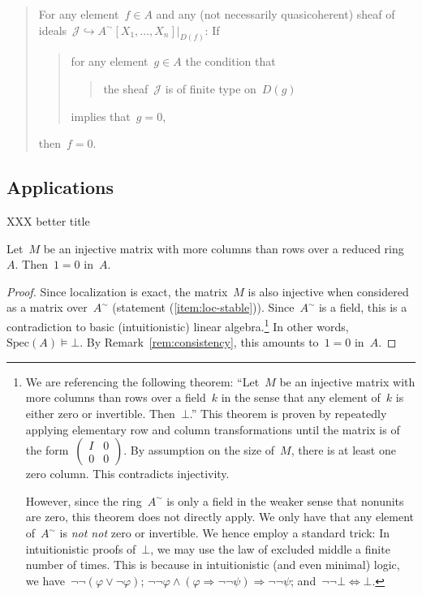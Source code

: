 \documentclass{ws-rv9x6}
\newcommand{\J}{\mathcal{J}}
\newcommand{\Spec}{\mathrm{Spec}}
\renewcommand{\_}{\mathpunct{.}}
\newcommand{\?}{\,{:}\,}
\begin{document}
\begin{quote}
For any element~$f \in A$ and any (not necessarily quasicoherent) sheaf of
ideals~$\J \hookrightarrow A^\sim[X_1,\ldots,X_n]|_{D(f)}$: If
\begin{quote}
for any element~$g \in A$ the condition that
\begin{quote}
the sheaf~$\J$ is of finite type on~$D(g)$
\end{quote}
implies that~$g = 0$,
\end{quote}
then~$f = 0$.
\end{quote}

\subsection{Applications}
\label{sect:example-applications}
XXX better title

\begin{proposition}Let~$M$ be an injective matrix with more columns than rows
over a reduced ring~$A$. Then~$1 = 0$ in~$A$.
\end{proposition}

\begin{proof}Since localization is exact, the matrix~$M$ is also injective when
considered as a matrix over~$A^\sim$ (statement (\ref{item:loc-stable})).
Since~$A^\sim$ is a field, this is a contradiction to basic (intuitionistic)
linear algebra.\footnote{We are referencing the following theorem: ``Let~$M$ be
an injective matrix with more columns than rows over a field~$k$ in the sense
that any element of~$k$ is either zero or invertible. Then~$\bot$.'' This
theorem is proven by repeatedly applying elementary row and column
transformations until the matrix is of the
form~$\left(\begin{smallmatrix}I&0\\0&0\end{smallmatrix}\right)$. By assumption
on the size of~$M$, there is at least one zero column. This contradicts
injectivity.

However, since the ring~$A^\sim$ is only a field in the weaker sense that
nonunits are zero, this theorem does not directly apply. We only have that any
element of~$A^\sim$ is \emph{not not} zero or invertible. We hence employ a
standard trick: In intuitionistic proofs of~$\bot$, we may use the law of
excluded middle a finite number of times. This is because in intuitionistic
(and even minimal) logic, we have~$\neg\neg(\varphi \vee \neg\varphi)$;
$\neg\neg\varphi \wedge (\varphi \Rightarrow \neg\neg\psi) \Longrightarrow
\neg\neg\psi$; and~$\neg\neg\bot \Leftrightarrow \bot$.}
In other words, $\Spec(A) \models \bot$. By
Remark~\ref{rem:consistency}, this amounts to~$1 = 0$ in~$A$.
\end{proof}
\end{document}
